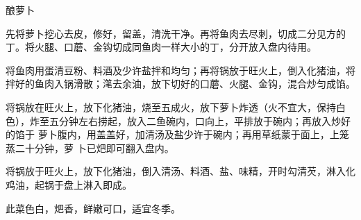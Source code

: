 %
%
%
%
%
%
%
\begin{recipe}{酿萝卜}

\ingredients


\preparation

\step 先将萝卜挖心去皮，修好，留盖，清洗干净。再将鱼肉去尽刺，切成二分见方的
丁。将火腿、口蘑、金钩切成同鱼肉一样大小的丁，分开放入盘内待用。

\step 将鱼肉用蛋清豆粉、料酒及少许盐拌和均匀；再将锅放于旺火上，倒入化猪油，将
拌好的鱼肉入锅滑散；滗去余油，放下切好的口蘑、火腿、金钩，混合炒匀成馅。

\step 将锅放在旺火上，放下化猪油，烧至五成火，放下萝卜炸透（火不宜大，保持白
色），炸至五分钟左右捞起，放入二鱼碗内，口向上，平排放于碗内；再放入炒好的馅于
萝卜腹内，用盖盖好，加清汤及盐少许于碗内；再用草纸蒙于面上，上笼蒸二十分钟，萝
卜已𤆵即可翻入盘内。

\step 将锅放于旺火上，放下化猪油，倒入清汤、料酒、盐、味精，开时勾清芡，淋入化
鸡油，起锅于盘上淋入即成。

\features

此菜色白，𤆵香，鲜嫩可口，适宜冬季。

\end{recipe}

